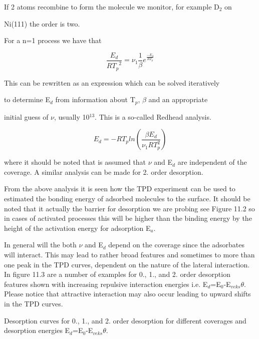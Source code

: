 If 2 atoms recombine to form the molecule we monitor, for example D$_2$ on 

Ni(111) the order is two.

For a n=1 process we have that

\begin{equation}

\label{eq:n=1a}

\frac{E_d}{R{T_p}^2} = {\nu}_1 \frac{1}{\beta}  e^{\frac{-E_d}{RT_p}}

\end{equation}

This can be rewritten as an expression which can be solved  iteratively

to determine E$_d$ from information about T$_p$, $\beta$ and an appropriate

initial guess of $\nu$, usually 10$^{13}$. This is a so-called Redhead analysis.

\begin{equation}

E_d = -RT_p ln(\frac{\beta E_d}{\nu_1 RT_p^2})

\end{equation}

where it should be noted that is assumed that $\nu$ and  E$_d$ are  independent of the coverage.
A similar analysis can be made for 2. order desorption.

From the above analysis it is seen how the TPD experiment can be used to estimated the bonding energy of adsorbed molecules to the surface. It should be noted that it actually the barrier for desorption we are probing see Figure 11.2 so in cases of activated processes this will be higher than the binding energy by the height of the activation energy for adsorption E$_a$.

In general will the both  $\nu$ and  E$_d$ depend on the coverage since the adsorbates will interact. This may lead to rather broad features and sometimes to more than one peak in the TPD curves, dependent on the nature of the lateral interaction. In figure 11.3 are a number of examples  for 0., 1., and 2. order desorption features shown with increasing repulsive interaction energies i.e. E$_d$=E$_0$-E$_{veks}\theta$. Please notice that attractive interaction may also occur leading to upward shifts in the TPD curves.



\vspace*{11cm}

 Desorption curves for 0., 1., and 2. order desorption for different coverages and desorption energies  E$_d$=E$_0$-E$_{veks}\theta$.

